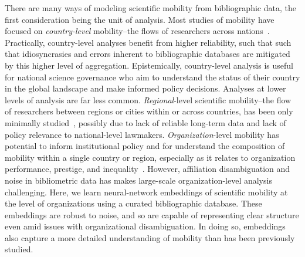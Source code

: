 \documentclass[12pt]{article} %
\begin{document}
There are many ways of modeling scientific mobility from bibliographic data, the first consideration being the unit of analysis. 
Most studies of mobility have focused on \textit{country-level} mobility--the flows of researchers across nations~\autocite{sugimoto2017mostimpact, scellato2015migrant, robinson-garcia2018indicators, franzoni2012foreign-born}.
Practically, country-level analyses benefit from higher reliability, such that such that idiosyncrasies and errors inherent to bibliographic databases are mitigated by this higher level of aggregation.
Epistemically, country-level analysis is useful for national science governance who aim to understand the status of their country in the global landscape and make informed policy decisions. 
Analyses at lower levels of analysis are far less common. 
\textit{Regional}-level scientific mobility--the flow of researchers between regions or cities within or across countries, has been only minimally studied~\autocite{vaccario2019mobility}, possibly due to lack of reliable long-term data and lack of policy relevance to national-level lawmakers. 
\textit{Organization}-level mobility has potential to inform institutional policy and for understand the composition of mobility within a single country or region, especially as it relates to organization performance, prestige, and inequality~\autocite{albarran2017topeconomic, deville2014career, morgan2018prestige, clauset2015hierarchy}.
However, affiliation disambiguation and noise in bibliometric data has makes large-scale organization-level analysis challenging.
Here, we learn neural-network embeddings of scientific mobility at the level of organizations using a curated bibliographic database.
These embeddings are robust to noise, and so are capable of representing clear structure even amid issues with organizational disambiguation. 
In doing so, embeddings also capture a more detailed understanding of mobility than has been previously studied. 
\end{document}
